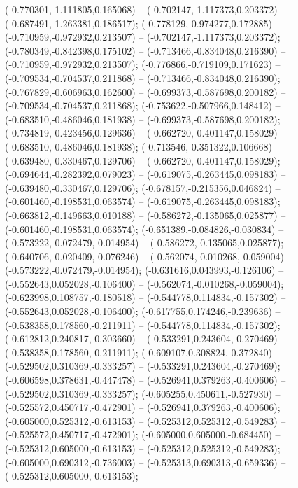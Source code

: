  (-0.770301,-1.111805,0.165068) -- (-0.702147,-1.117373,0.203372) -- (-0.687491,-1.263381,0.186517);
 (-0.778129,-0.974277,0.172885) -- (-0.710959,-0.972932,0.213507) -- (-0.702147,-1.117373,0.203372);
 (-0.780349,-0.842398,0.175102) -- (-0.713466,-0.834048,0.216390) -- (-0.710959,-0.972932,0.213507);
 (-0.776866,-0.719109,0.171623) -- (-0.709534,-0.704537,0.211868) -- (-0.713466,-0.834048,0.216390);
 (-0.767829,-0.606963,0.162600) -- (-0.699373,-0.587698,0.200182) -- (-0.709534,-0.704537,0.211868);
 (-0.753622,-0.507966,0.148412) -- (-0.683510,-0.486046,0.181938) -- (-0.699373,-0.587698,0.200182);
 (-0.734819,-0.423456,0.129636) -- (-0.662720,-0.401147,0.158029) -- (-0.683510,-0.486046,0.181938);
 (-0.713546,-0.351322,0.106668) -- (-0.639480,-0.330467,0.129706) -- (-0.662720,-0.401147,0.158029);
 (-0.694644,-0.282392,0.079023) -- (-0.619075,-0.263445,0.098183) -- (-0.639480,-0.330467,0.129706);
 (-0.678157,-0.215356,0.046824) -- (-0.601460,-0.198531,0.063574) -- (-0.619075,-0.263445,0.098183);
 (-0.663812,-0.149663,0.010188) -- (-0.586272,-0.135065,0.025877) -- (-0.601460,-0.198531,0.063574);
 (-0.651389,-0.084826,-0.030834) -- (-0.573222,-0.072479,-0.014954) -- (-0.586272,-0.135065,0.025877);
 (-0.640706,-0.020409,-0.076246) -- (-0.562074,-0.010268,-0.059004) -- (-0.573222,-0.072479,-0.014954);
 (-0.631616,0.043993,-0.126106) -- (-0.552643,0.052028,-0.106400) -- (-0.562074,-0.010268,-0.059004);
 (-0.623998,0.108757,-0.180518) -- (-0.544778,0.114834,-0.157302) -- (-0.552643,0.052028,-0.106400);
 (-0.617755,0.174246,-0.239636) -- (-0.538358,0.178560,-0.211911) -- (-0.544778,0.114834,-0.157302);
 (-0.612812,0.240817,-0.303660) -- (-0.533291,0.243604,-0.270469) -- (-0.538358,0.178560,-0.211911);
 (-0.609107,0.308824,-0.372840) -- (-0.529502,0.310369,-0.333257) -- (-0.533291,0.243604,-0.270469);
 (-0.606598,0.378631,-0.447478) -- (-0.526941,0.379263,-0.400606) -- (-0.529502,0.310369,-0.333257);
 (-0.605255,0.450611,-0.527930) -- (-0.525572,0.450717,-0.472901) -- (-0.526941,0.379263,-0.400606);
 (-0.605000,0.525312,-0.613153) -- (-0.525312,0.525312,-0.549283) -- (-0.525572,0.450717,-0.472901);
 (-0.605000,0.605000,-0.684450) -- (-0.525312,0.605000,-0.613153) -- (-0.525312,0.525312,-0.549283);
 (-0.605000,0.690312,-0.736003) -- (-0.525313,0.690313,-0.659336) -- (-0.525312,0.605000,-0.613153);
